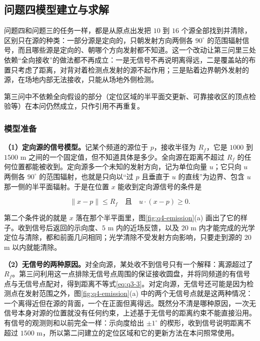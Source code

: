 \subsection{问题四模型建立与求解}\label{sec:q4}

问题四和问题三的任务一样，都是从原点出发把 $10$ 到 $16$ 个源全部找到并清除，区别只在源的种类：一部分源是定向的，只朝发射方向两侧各 $90^\circ$ 的范围辐射信号，而且哪些源是定向的、朝哪个方向发射都不知道。这一个改动让第三问里三处依赖“全向接收”的做法都不再成立：一是无信号不再说明离得远，二是覆盖站的布置只考虑了距离，对背对着检测点发射的源不起作用；三是贴着边界朝外发射的源，在场地内部无法接收，只能从场地外侧检测。

第三问中不依赖全向假设的部分（定位区域的半平面交更新、可靠接收区的顶点检验等）在本问仍然成立，只作引用不再重复。

\subsubsection{模型准备}\label{sec:q4-1}

\textbf{（1）定向源的信号模型。}记某个频道的源位于 $p$，接收半径为 $R_f$，它是 $1000$ 到 $1500$ m 之间的一个固定值，但不知道具体是多少。全向源在距离不超过 $R_f$ 的任何位置都能被收到。定向源多一个未知的发射方向，记为单位向量 $u$；它只向 $u$ 两侧各 $90^\circ$ 的范围辐射，也就是只向以“过 $p$ 且垂直于 $u$ 的直线”为边界、包含 $u$ 那一侧的半平面辐射。于是在位置 $x$ 能收到定向源信号的条件是

\begin{equation}\label{eq:q4-1}
\|x-p\|\le R_f\quad\text{且}\quad u\cdot(x-p)\ge0 .
\end{equation}

第二个条件说的就是 $x$ 落在那个半平面里，图\ref{fig:q4-emission}(a) 画出了它的样子。收到信号后返回的示向度、$5$ m 内的近场反馈，以及 $20$ m 内才能完成的光学定位与清除，都和前面几问相同；光学清除不受发射方向影响，只要走到源的 $20$ m 以内就能清除。

\textbf{（2）无信号的两种原因。}对全向源，某处收不到信号只有一个解释：离源超过了 $R_f$。第三问利用这一点排除无信号点周围的保证接收圆盘，并将同频道的有信号点与无信号点配对，得到距离不等式\eqref{eq:q3-3}。对定向源，无信号还可能是因为检测点在发射范围之外，图\ref{fig:q4-emission}(a) 中的两个无信号点就是这两种情况：一个离得近但在源的背面，一个在正面但离得远。既然分不清是哪种原因，一次无信号本身对源的位置就没有任何约束，上述基于无信号的距离约束不能直接沿用。有信号的观测则和以前完全一样：示向度给出 $\pm1^\circ$ 的楔形，收到信号说明距离不超过 $1500$ m，所以第二问建立的定位区域和它的更新方法在本问照常使用。

